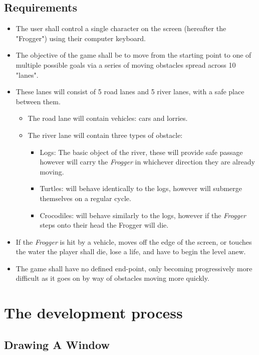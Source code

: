 \documentclass[12pt, a4paper]{report}
\begin{document}
\subsection{Requirements}
\begin{itemize}
  \item The user shall control a single character on the screen (hereafter the "Frogger") using their computer keyboard.
  \item The objective of the game shall be to move from the starting point to one of multiple possible goals via a series of moving obstacles spread across 10 "lanes".
  \item These lanes will consist of 5 road lanes and 5 river lanes, with a safe place between them.
    \begin{itemize}
      \item The road lane will contain vehicles: cars and lorries.
      \item The river lane will contain three types of obstacle:
        \begin{itemize}
          \item Logs: The basic object of the river, these will provide safe passage however will carry the \textit{Frogger} in whichever direction they are already moving.
          \item Turtles: will behave identically to the logs, however will submerge themselves on a regular cycle.
          \item Crocodiles: will behave similarly to the logs, however if the \textit{Frogger} steps onto their head the Frogger will die.
        \end{itemize}
    \end{itemize}
  \item If the \textit{Frogger} is hit by a vehicle, moves off the edge of the screen, or touches the water the player shall die, lose a life, and have to begin the level anew.
  \item The game shall have no defined end-point, only becoming progressively more difficult as it goes on by way of obstacles moving more quickly.
\end{itemize}

\section{The development process}

\subsection{Drawing A Window}
\end{document}
